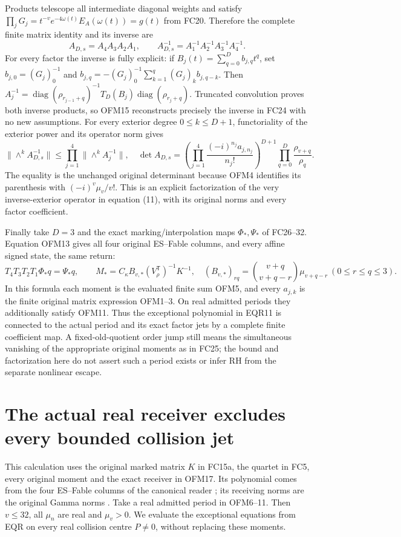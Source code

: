 \documentclass[11pt]{article}
\begin{document}
Products telescope all intermediate diagonal weights and satisfy
$\prod_jG_j=t^{-v}e^{-4\omega(t)}E_A(\omega(t))=g(t)$ from FC20.
Therefore the complete finite matrix identity and its inverse are
\[
 A_{D,s}=A_4A_3A_2A_1,\qquad
 A_{D,s}^{-1}=A_1^{-1}A_2^{-1}A_3^{-1}A_4^{-1}.
 \tag{OFM15}
\]
For every factor the inverse is fully explicit: if
$B_j(t)=\sum_{q=0}^D b_{j,q}t^q$, set
$b_{j,0}=(G_j)_0^{-1}$ and
$b_{j,q}=-(G_j)_0^{-1}\sum_{k=1}^q(G_j)_k b_{j,q-k}$.
Then $A_j^{-1}=\operatorname{diag}(\rho_{r_{j-1}+q})^{-1}
T_D(B_j)\operatorname{diag}(\rho_{r_j+q})$.
Truncated convolution proves both inverse products, so OFM15
reconstructs precisely the inverse in FC24 with no new assumptions.
For every exterior degree $0\le k\le D+1$, functoriality of the
exterior power and its operator norm gives
\[
 \|\wedge^k A_{D,s}^{-1}\|
   \le\prod_{j=1}^4\|\wedge^k A_j^{-1}\|,
 \quad
 \det A_{D,s}=
 \left(\prod_{j=1}^4\frac{(-i)^{n_j}a_{j,n_j}}{n_j!}\right)^{D+1}
 \prod_{q=0}^D\frac{\rho_{v+q}}{\rho_q}.
 \tag{OFM16}
\]
The equality is the unchanged original determinant because OFM4
identifies its parenthesis with $(-i)^v\mu_v/v!$. This is an
explicit factorization of the very inverse-exterior operator in
equation (11), with its original norms and every factor coefficient.

Finally take $D=3$ and the exact marking/interpolation maps
$\Phi_*,\Psi_*$ of FC26--32. Equation OFM13 gives all four original
ES--Fable columns, and every affine signed state, the same return:
\[
 T_4T_3T_2T_1\Phi_*q=\Psi_*q,\qquad
 M_*=C_\kappa B_{v,*}(V_\rho^{\mathsf T})^{-1}K^{-1},
 \quad (B_{v,*})_{r q}=\binom{v+q}{v+q-r}\mu_{v+q-r}
 \ (0\le r\le q\le3).
 \tag{OFM17}
\]
In this formula each moment is the evaluated finite sum OFM5, and
every $a_{j,k}$ is the finite original matrix expression OFM1--3.
On real admitted periods they additionally satisfy OFM11.
Thus the exceptional polynomial in EQR11 is connected to the actual
period and its exact factor jets by a complete finite coefficient
map. A fixed-old-quotient order jump still means the simultaneous
vanishing of the appropriate original moments as in FC25; the bound
and factorization here do not assert such a period exists or infer
RH from the separate nonlinear escape.

\section{The actual real receiver excludes every bounded collision jet}
This calculation uses the original marked matrix $K$ in FC15a,
the quartet in FC5, every original moment and the exact receiver in
OFM17. Its polynomial comes from the four ES--Fable columns of the
canonical reader \cite{ES488}; its receiving norms are the original
Gamma norms \cite{WCF}. Take a real admitted period in OFM6--11.
Then $v\le32$, all $\mu_n$ are real and $\mu_v>0$.
We evaluate the exceptional equations from EQR on every real
collision centre $P\ne0$, without replacing these moments.
\end{document}
